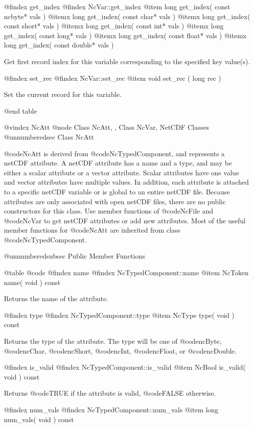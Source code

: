 @findex get_index
@findex NcVar::get_index
@item  long get_index( const ncbyte* vals )
@itemx long get_index( const char* vals )
@itemx long get_index( const short* vals )
@itemx long get_index( const int* vals )
@itemx long get_index( const long* vals )
@itemx long get_index( const float* vals )
@itemx long get_index( const double* vals )

Get first record index for this variable corresponding to the specified
key value(s).

@findex set_rec
@findex NcVar::set_rec
@item void set_rec ( long rec )

Set the current record for this variable.

@end table

@vindex NcAtt
@node Class NcAtt,  , Class NcVar, NetCDF Classes
@unnumberedsec  Class NcAtt

@code{NcAtt} is derived from @code{NcTypedComponent}, and represents a netCDF
attribute.  A netCDF attribute has a name and a type, and may be either
a scalar attribute or a vector attribute.  Scalar attributes have one
value and vector attributes have multiple values.  In addition, each
attribute is attached to a specific netCDF variable or is global to an
entire netCDF file.  Because attributes are only associated with open
netCDF files, there are no public constructors for this class.  Use
member functions of @code{NcFile} and @code{NcVar} to get netCDF
attributes or add new attributes.  Most of the useful member functions
for @code{NcAtt} are
inherited from class @code{NcTypedComponent}.

@unnumberedsubsec Public Member Functions

@table @code
@findex name
@findex NcTypedComponent::name
@item NcToken name( void ) const

Returns the name of the attribute.

@findex type
@findex NcTypedComponent::type
@item NcType type( void ) const

Returns the type of the attribute.  The type will be one of
@code{ncByte}, @code{ncChar}, @code{ncShort}, @code{ncInt},
@code{ncFloat}, or @code{ncDouble}.

@findex is_valid
@findex NcTypedComponent::is_valid
@item NcBool is_valid( void ) const

Returns @code{TRUE} if the attribute is valid, @code{FALSE} otherwise.

@findex num_vals
@findex NcTypedComponent::num_vals
@item long num_vals( void ) const

